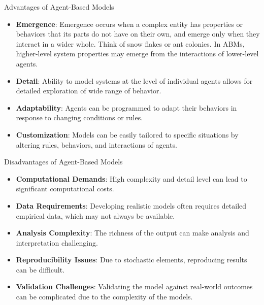 \begin{frame}{Advantages of Agent-Based Models}
\begin{itemize}
    \item \textbf{Emergence}: Emergence occurs when a complex entity has properties or behaviors that its parts do not have on their own, and emerge only when they interact in a wider whole. Think of snow flakes or ant colonies. In ABMs, higher-level system properties may emerge from the interactions of lower-level agents.
        \pause
    \item \textbf{Detail}: Ability to model systems at the level of individual agents allows for detailed exploration of wide range of behavior. 
        \pause
    \item \textbf{Adaptability}: Agents can be programmed to adapt their behaviors in response to changing  conditions or rules.
        \pause
    \item \textbf{Customization}: Models can be easily tailored to specific situations by altering rules, behaviors, and interactions of agents.
\end{itemize}
\end{frame}

\begin{frame}{Disadvantages of Agent-Based Models}
\begin{itemize}
    \item \textbf{Computational Demands}: High complexity and detail level can lead to significant computational costs.
        \pause
    \item \textbf{Data Requirements}: Developing realistic models often requires detailed empirical data, which may not always be available.
        \pause
    \item \textbf{Analysis Complexity}: The richness of the output can make analysis and interpretation challenging.
        \pause
    \item \textbf{Reproducibility Issues}: Due to stochastic elements, reproducing results can be difficult.
        \pause
    \item \textbf{Validation Challenges}: Validating the model against real-world outcomes can be complicated due to the complexity of the models.
\end{itemize}
\end{frame}




